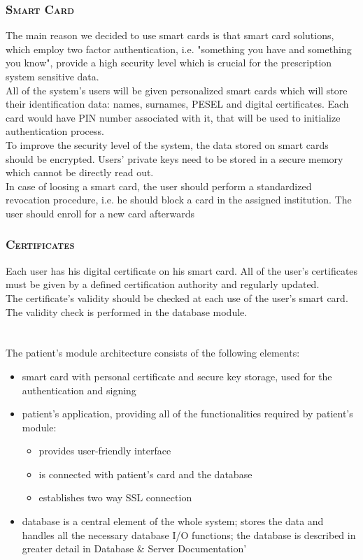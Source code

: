 \subsection{\textsc{Smart Card}}
The main reason we decided to use smart cards is that smart card solutions, which employ two factor authentication, i.e. "something you have and something you know", provide a high security level which is crucial for the prescription system sensitive data.
\\

All of the system's users will be given personalized smart cards which will store their identification data: names, surnames, PESEL and digital certificates. 
Each card would have PIN number associated with it, that will be used to initialize authentication process.
\\

To improve the security level of the system, the data stored on smart cards should be encrypted. 
Users' private keys need to be stored in a secure memory which cannot be directly read out.
\\

In case of loosing a smart card, the user should perform a standardized revocation procedure, i.e. he should block a card in the assigned institution. 
The user should enroll for a new card afterwards

\subsection{\textsc{Certificates}}
Each user has his digital certificate on his smart card. 
All of the user's certificates must be given by a defined certification authority and regularly updated.
\\

The certificate's validity should be checked at each use of the user's smart card.
The validity check is performed in the database module.

\newpage
\chapter {}

The patient's module architecture consists of the following elements:
\begin{itemize}
\item smart card with personal certificate and secure key storage, used for the authentication and signing
\item patient's application, providing all of the functionalities required by patient's module:
\begin{itemize}
\item provides user-friendly interface
\item is connected with patient's card and the database
\item establishes two way SSL connection	
\end{itemize}
\item database is a central element of the whole system; stores the data and handles all the necessary database I/O functions; the database is described in greater detail in Database \& Server Documentation'
\end{itemize}

